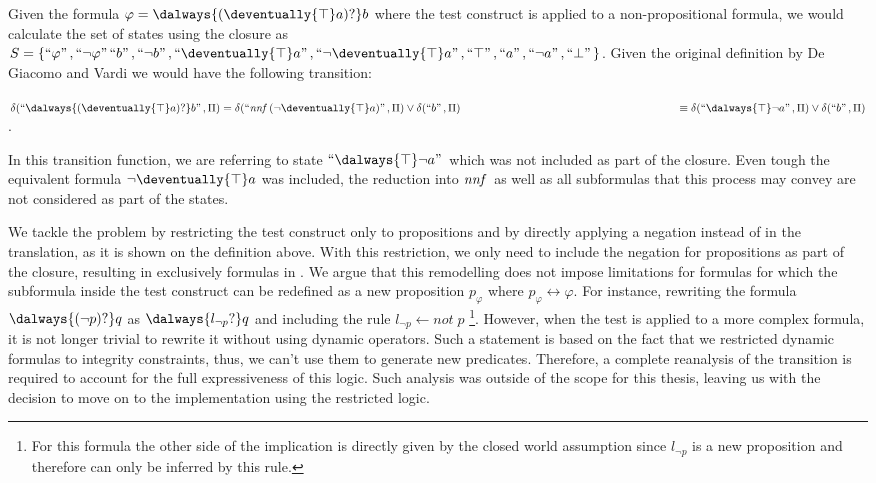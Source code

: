 \begin{example}
    Given the formula $\varphi = \dalways{(\deventually{\top}a)?}b$ where the test construct is applied to a non-propositional formula, we would calculate the set of states using the closure as $S=\{\s{\varphi}, \s{\neg \varphi} \s{b}, \s{\neg b}, \s{\deventually{\top}a}, \s{\neg \deventually{\top}a}, \s{\top}, \s{a}, \s{\neg a}, \s{\bot}\}$. Given the original definition by De Giacomo and Vardi we would have the following transition: 
    
    $\delta(\s{\dalways{(\deventually{\top}a)?}b},\Pi) = \delta(\s{\nnf(\neg \deventually{\top}a)},\Pi) \vee \delta(\s{b},\Pi) \\\phantom{\delta(\s{\dalways{(\deventually{\top}a)?}b},\Pi)\;} \; \equiv \delta(\s{\dalways{\top}\neg a},\Pi) \vee \delta(\s{b},\Pi)$ .

    In this transition function, we are referring to state $\s{\dalways{\top}\neg a}$ which was not included as part of the closure. Even tough the equivalent formula $\neg \deventually{\top}a$ was included, the reduction into $\mathit{nnf}\,$ as well as all subformulas that this process may convey are not considered as part of the states.
\end{example}

We tackle the problem by restricting the test construct only to propositions and by directly applying a negation instead of \nnf in the translation, as it is shown on the definition above.
With this restriction, we only need to include the negation for propositions as part of the closure, resulting in exclusively formulas in \nnf. 
We argue that this remodelling does not impose limitations for formulas for which the subformula inside the test construct can be redefined as a new proposition $p_{\varphi}$ where $p_\varphi \leftrightarrow \varphi$. 
For instance, rewriting the formula $\dalways{(\neg p) ?} q$ as $\dalways{l_{\neg p} ?} q$ and including the rule $l_{\neg p} \leftarrow not \;p$ \footnote{For this formula the other side of the implication is directly given by the closed world assumption since $l_{\neg p}$ is a new proposition and therefore can only be inferred by this rule.}.
However, when the test is applied to a more complex formula, it is not longer trivial to rewrite it without using dynamic operators. 
Such a statement is based on the fact that we restricted dynamic formulas to integrity constraints, thus, we can't use them to generate new predicates. 
Therefore, a complete reanalysis of the transition is required to account for the full expressiveness of this logic.
Such analysis was outside of the scope for this thesis, leaving us with the decision to move on to the implementation using the restricted logic.


